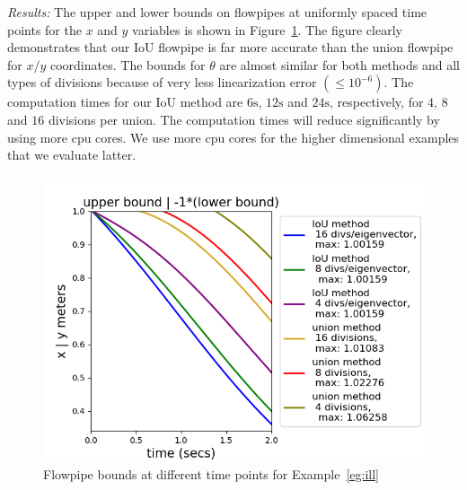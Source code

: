 \emph{Results:}  The upper and lower bounds on flowpipes at uniformly spaced time
points for the $x$ and $y$ variables is
shown in Figure~\ref{fig:ill}. 
The figure clearly demonstrates that our IoU
flowpipe is far more accurate than the union flowpipe for $x/y$
coordinates.  The bounds for $\theta$ are almost similar for both
methods and all types of divisions because of very less linearization
error $(\le 10^{-6})$.  The computation times for our IoU method are $6\si{\second}$, $12\si{\second}$ and $24\si{\second}$, respectively, for $4$, $8$ and $16$ divisions
per union.  The computation times will reduce significantly by using
more cpu cores.  We use more cpu cores for the higher dimensional
examples that we evaluate latter.
%
\begin{figure}
  \includegraphics[scale = 0.7]{illImages/Ub.png}
  \caption{Flowpipe bounds at different time points for
    Example~\ref{eg:ill}}
  \label{fig:ill}
\end{figure}
%
